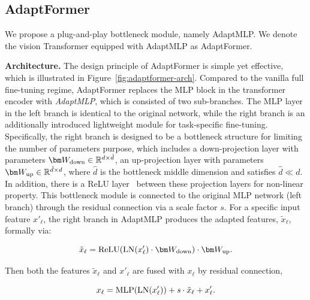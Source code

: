 \subsection{AdaptFormer}
We propose a plug-and-play bottleneck module, namely AdaptMLP\footnotemark.
 We denote the vision Transformer equipped with AdaptMLP as AdaptFormer.

\textbf{Architecture.}
The design principle of AdaptFormer is simple yet effective, which is illustrated in Figure~\ref{fig:adaptformer-arch}. Compared to the vanilla full fine-tuning regime, AdaptFormer replaces the MLP block in the transformer encoder with \emph{AdaptMLP}, which is consisted of two sub-branches. The MLP layer in the left branch is identical to the original network, while the right branch is an additionally introduced lightweight module for task-specific fine-tuning. Specifically, the right branch is designed to be a bottleneck structure for limiting the number of parameters purpose, which includes a down-projection layer with parameters $\bm W_{\rm down} \in \mathbb{R}^{d\times\hat{d}}$, an up-projection layer with parameters $\bm W_{\rm up} \in \mathbb{R}^{\hat{d}\times d}$, where $\hat{d}$ is the bottleneck middle dimension and satisfies $\hat{d} \ll d$. In addition, there is a ReLU layer~\cite{agarap-2018-relu} between these projection layers for non-linear property. This bottleneck module is connected to the original MLP network (left branch) through the residual connection via a scale factor $\mathit{s}$.
For a specific input feature $x'_\ell$, the right branch in AdaptMLP produces the adapted features, $\tilde{x}_\ell$, formally via:

\begin{equation}
    \tilde{x}_\ell =  {\rm ReLU}({\rm LN}(x'_\ell) \cdot {\bm W_{\rm down}})\cdot {\bm W_{\rm up}}.
    \label{eq:ada_fea}
\end{equation}

Then both the features $ \tilde{x}_\ell$ and $x'_\ell$ are fused with $x_\ell$ by residual connection,

\begin{equation}
    x_\ell =  {\rm MLP}({\rm LN}(x'_\ell)) + \mathit{s}\cdot \tilde{x}_\ell + x'_\ell.
    \label{eq:adapter}
\end{equation}

